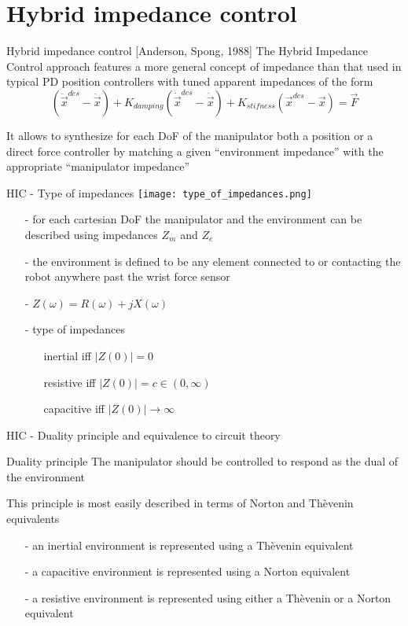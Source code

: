 \section{Hybrid impedance control}

\begin{frame}{Hybrid impedance control [Anderson, Spong, 1988]}
  The Hybrid Impedance Control approach features \alert{a more general concept of
  impedance} than that used in typical PD position controllers with tuned
  apparent impedances of the form
  \[
  (\ddot{\vec{x}}^{des} - \ddot{\vec{x}}) + K_{damping} (\dot{\vec{x}}^{des} - \dot{\vec{x}})
  + K_{stifness}(\vec{x}^{des} - \vec{x}) = \vec{F}
  \]
  \par
  It allows to synthesize for each DoF of the manipulator both a position or a \alert{direct
    force} controller by matching a given ``environment impedance'' with the appropriate
  ``manipulator impedance''
\end{frame}

\begin{frame}{HIC - Type of impedances}
  \centering
  \texttt{[image: type\_of\_impedances.png]}
  \begin{itemize}
  \item[-] for each cartesian DoF the manipulator and the environment can be described using impedances $Z_m$ and $Z_e$
  \item[-] the environment is defined to be any element connected
    to or contacting the robot anywhere \alert{past the wrist} force sensor
  \item[-] $Z(\omega) = R(\omega) + j X(\omega)$
  \item[-] type of impedances
    \begin{itemize}
    \item[] inertial iff $|Z(0)| = 0$
    \item[] resistive iff $|Z(0)| = c \in (0, \infty)$
    \item[] capacitive iff $|Z(0)| \rightarrow \infty$
    \end{itemize}
  \end{itemize}
\end{frame}

\begin{frame}{HIC - Duality principle and equivalence to circuit theory}
  \begin{block}{Duality principle}
    The manipulator should be controlled to respond as the dual of the environment
  \end{block}

  This principle is most easily described in terms of Norton and Thèvenin equivalents
  \begin{itemize}
  \item[-] an inertial environment is represented using a Thèvenin equivalent
  \item[-] a capacitive environment is represented using a Norton equivalent
  \item[-] a resistive environment is represented using either a Thèvenin or a Norton equivalent
  \end{itemize}
\end{frame}

